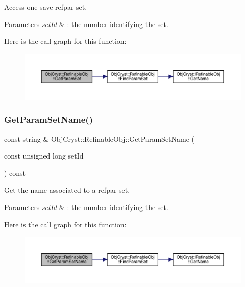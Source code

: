 Access one save refpar set. 


\begin{DoxyParams}{Parameters}
{\em set\+Id} & \+: the number identifying the set. \\
\hline
\end{DoxyParams}
Here is the call graph for this function\+:
\nopagebreak
\begin{figure}[H]
\begin{center}
\leavevmode
\includegraphics[width=350pt]{class_obj_cryst_1_1_refinable_obj_abbc5f8e9aaf4dcd7dbe96233ad96f5e0_cgraph}
\end{center}
\end{figure}
\mbox{\label{class_obj_cryst_1_1_refinable_obj_a266c79068ce53c9b5040809004bf3c63}} 
\subsubsection{\texorpdfstring{GetParamSetName()}{GetParamSetName()}}
{\footnotesize\ttfamily const string \& Obj\+Cryst\+::\+Refinable\+Obj\+::\+Get\+Param\+Set\+Name (\begin{DoxyParamCaption}\item[{const unsigned long}]{set\+Id }\end{DoxyParamCaption}) const}



Get the name associated to a refpar set. 


\begin{DoxyParams}{Parameters}
{\em set\+Id} & \+: the number identifying the set. \\
\hline
\end{DoxyParams}
Here is the call graph for this function\+:
\nopagebreak
\begin{figure}[H]
\begin{center}
\leavevmode
\includegraphics[width=350pt]{class_obj_cryst_1_1_refinable_obj_a266c79068ce53c9b5040809004bf3c63_cgraph}
\end{center}
\end{figure}
\mbox{\label{class_obj_cryst_1_1_refinable_obj_a77a4f8d1b3b1184ac92b1a4b55a7f77a}} 
